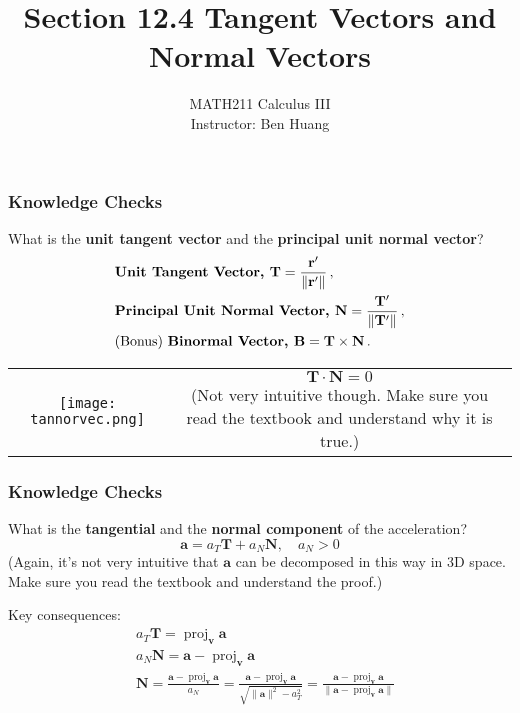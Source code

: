 \documentclass[10pt]{beamer}
\author[B.H.]{{\Large MATH211 Calculus III}\\\vspace{6pt}Instructor: Ben Huang}
\date{}
\title[Section 12.4]{Section 12.4 Tangent Vectors and Normal Vectors}
\institute[MU]{\texttt{[image: MCLogo-Bck.png]}}
\newcommand{\norm}[1]{\lVert#1\rVert}
\begin{document}
\frame{\titlepage}

\begin{frame}
\frametitle{Knowledge Checks}
What is the {\bf unit tangent vector} and the {\bf principal unit normal vector}?
\begin{align*}
&\text{\bf Unit Tangent Vector, }\mathbf T = \frac{\mathbf r'}{\norm{\mathbf r'}}\,,\\
&\text{\bf Principal Unit Normal Vector, }\mathbf N = \frac{\mathbf T'}{\norm{\mathbf T'}}\,,\\
&\text{(Bonus) \bf Binormal Vector, }\mathbf B = \mathbf T\times\mathbf N\,.
\end{align*}\pause
\begin{tabular}{cc}
\texttt{[image: tannorvec.png]}&\parbox{0.5\textwidth}{\centering $\mathbf T\cdot\mathbf N = 0$\\(Not very intuitive though. Make sure you read the textbook and understand why it is true.)\vspace{10em}}
\end{tabular}
\end{frame}

\begin{frame}
\frametitle{Knowledge Checks}
What is the {\bf tangential} and the {\bf normal component} of the acceleration?\pause
\[
\mathbf a = a_T\mathbf T + a_N\mathbf N,\quad a_N > 0
\]
\pause
(Again, it's not very intuitive that $\mathbf a$ can be decomposed in this way in 3D space. Make sure you read the textbook and understand the proof.)
\pause

Key consequences:
\begin{align*}
&a_T\mathbf T = \operatorname{proj}_\mathbf v\mathbf a\\
&a_N\mathbf N = \mathbf a - \operatorname{proj}_\mathbf v \mathbf a\\
&\mathbf N = \frac{\mathbf a - \operatorname{proj}_\mathbf v \mathbf a}{a_N} = \frac{\mathbf a - \operatorname{proj}_\mathbf v \mathbf a}{\sqrt{\norm{\mathbf a}^2 - a_T^2}} = \frac{\mathbf a - \operatorname{proj}_\mathbf v \mathbf a}{\norm{\mathbf a - \operatorname{proj}_\mathbf v \mathbf a}}  
\end{align*}
\end{frame}
\end{document}
